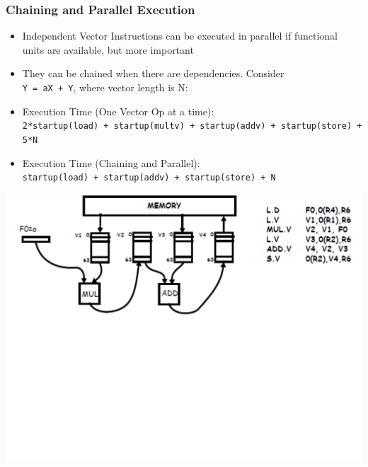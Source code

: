 \documentclass{beamer}
\begin{document}
\begin{frame}[fragile,t]
\frametitle{Chaining and Parallel Execution}

\begin{itemize}
    \item Independent Vector Instructions can be executed in parallel
            if functional units are available, but more important\smallskip
    \item They can be chained when there are dependencies. 
            Consider\\ {\tt Y = aX + Y}, where vector length is N:\smallskip

    \item Execution Time (One Vector Op at a time):\\
            {\tt 2*startup(load) + startup(multv) + startup(addv) + 
                    startup(store) + 5*N}\smallskip

    \item Execution Time (Chaining and Parallel):\\
            {\tt startup(load) + startup(addv) + startup(store) + N} 
\end  {itemize}

\includegraphics[width=59ex]{Figures/VectChaining}

\end{frame}
\end{document}
